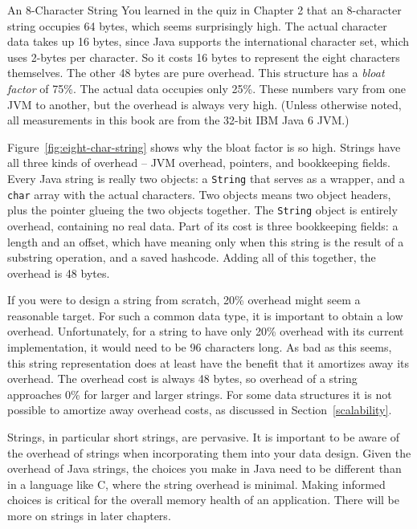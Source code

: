 \begin{example}{An 8-Character String}
 You learned in the quiz in Chapter 2 that an 8-character string occupies 64 bytes, which seems surprisingly high. The actual character data takes up 16 bytes, since Java supports the international character set, which uses 2-bytes per character. So it costs 16 bytes to represent the eight characters themselves. The other 48 bytes are pure overhead. This structure has a \emph{bloat factor} of 75\%. The actual data occupies only 25\%. These numbers vary from one JVM to another, but the overhead is always very high. (Unless otherwise noted, all measurements in this book are from the 32-bit IBM Java 6 JVM.)

Figure~\ref{fig:eight-char-string} shows why the bloat factor is so high. Strings have all three kinds of overhead -- JVM overhead, pointers, and bookkeeping fields. Every Java string is really two objects: a {\tt String} that serves as a wrapper, and a {\tt char} array with the actual characters. Two objects means two object headers, plus the pointer glueing the two objects together. The {\tt String} object is entirely overhead, containing no real data. Part of its cost is three bookkeeping fields: a length and an offset, which have meaning only when this string is the result of a substring operation, and a saved hashcode. Adding all of this together, the overhead is 48 bytes.  
\end{example}
If you were to design a string from scratch, 20\%
overhead might seem a reasonable target. For such a common data type, it is important to obtain a low overhead.
Unfortunately, for a string to have only 20\% overhead with its current implementation, it would need
to be 96 characters long. As bad as this seems, this string
representation does at least have the benefit that it amortizes away
its overhead. The overhead cost is always 48 bytes, so overhead of a string approaches 0\% for larger and larger strings.  For some data structures it is not possible to
amortize away overhead costs, as discussed in
Section~\ref{scalability}.

Strings, in particular short strings, are pervasive. It is important to be aware of the overhead of strings when incorporating them into your data design. Given the overhead of Java strings, the choices you make in Java need to be different than in a language like C, where the string overhead is minimal. Making informed choices is critical for the overall memory health of an application. There will be more on strings in later chapters.

